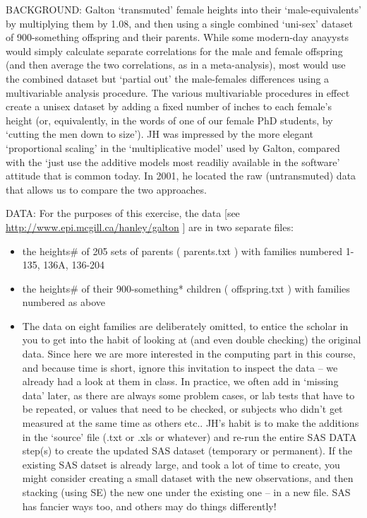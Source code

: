 \documentclass[]{book}
\begin{document}
BACKGROUND: Galton `transmuted' female heights into their `male-equivalents' by multiplying them by 1.08, and then using a single combined `uni-sex' dataset of 900-something offspring and their parents. While some modern-day anayysts would simply calculate separate correlations for the male and female offspring (and then average the two correlations, as in a meta-analysis), most would use the combined dataset but `partial out' the male-females differences using a multivariable analysis procedure. The various multivariable procedures in effect create a unisex dataset by adding a fixed number of inches to each female's height (or, equivalently, in the words of one of our female PhD students, by `cutting the men down to size'). JH was impressed by the more elegant `proportional scaling' in the `multiplicative model' used by Galton, compared with the `just use the additive models most readiliy available in the software' attitude that is common today. In 2001, he located the raw (untransmuted) data that allows us to compare the two approaches.

DATA: For the purposes of this exercise, the data {[}see \url{http://www.epi.mcgill.ca/hanley/galton} {]} are in two separate files:

\begin{itemize}
\item
  the heights\# of 205 sets of parents ( parents.txt ) with families numbered 1-135, 136A, 136-204
\item
  the heights\# of their 900-something* children ( offspring.txt ) with families numbered as above
\item
  The data on eight families are deliberately omitted, to entice the scholar in you to get into the habit of looking at (and even double checking) the original data. Since here we are more interested in the computing part in this course, and because time is short, ignore this invitation to inspect the data -- we already had a look at them in class. In practice, we often add in `missing data' later, as there are always some problem cases, or lab tests that have to be repeated, or values that need to be checked, or subjects who didn't get measured at the same time as others etc.. JH's habit is to make the additions in the `source' file (.txt or .xls or whatever) and re-run the entire SAS DATA step(s) to create the updated SAS dataset (temporary or permanent). If the existing SAS datset is already large, and took a lot of time to create, you might consider creating a small dataset with the new observations, and then stacking (using SE) the new one under the existing one -- in a new file. SAS has fancier ways too, and others may do things differently!
\end{itemize}
\end{document}

